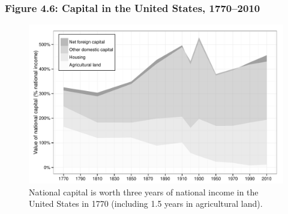 \documentclass[t]{beamer}\usepackage[]{graphicx}\usepackage[]{color}
\newenvironment{knitrout}{}{} %
\begin{document}
\begin{frame}[label=Figure_4_6]
\frametitle{Figure 4.6: Capital in the United States, 1770--2010}
\begin{figure}[t]
\begin{minipage}[b]{\textwidth}
\centering
\begin{knitrout}\footnotesize
{}\color{fgcolor}

{\centering \includegraphics[width=1\linewidth]{figures/bw/Figure_4_6} 

}



\end{knitrout}
\caption{National capital is worth three years of national income in the United States in 1770 (including 1.5 years in agricultural land).}
\end{minipage}
\end{figure}
\end{frame}
\end{document}
